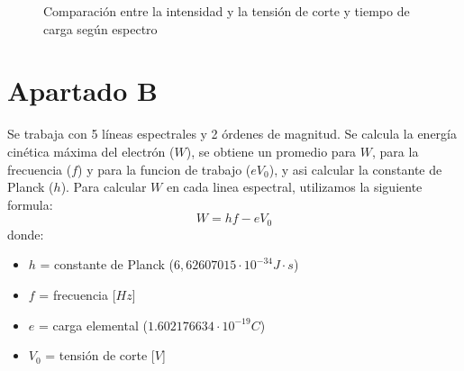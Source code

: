\documentclass[a4paper,12pt]{report}
\begin{document}
    \begin{figure}[h!]
      \begin{minipage}{0.4\textwidth} %
      \end{minipage}
      \hspace{1cm}
      \begin{minipage}{0.4\textwidth} %
      \end{minipage}
      \caption{Comparación entre la intensidad y la tensión de corte y tiempo de carga según espectro}
      \label{fig:comparison}
  \end{figure}

  \newpage

  \section{Apartado B}
    Se trabaja con 5 líneas espectrales y 2 órdenes de magnitud. Se calcula la energía cinética máxima del electrón
    ($W$), se obtiene un promedio para $W$, para la frecuencia ($f$) y para la funcion de trabajo ($eV_0$), y asi
    calcular la constante de Planck ($h$).
    Para calcular $W$ en cada linea espectral, utilizamos la siguiente formula:
    $$W = hf - eV_0$$
    donde:
    \begin{itemize}
      \item $h$ = constante de Planck ($6,62607015 \cdot 10^{-34} J \cdot s$)
      \item $f$ = frecuencia [$Hz$]
      \item $e$ = carga elemental ($1.602176634 \cdot 10^{-19} C$)
      \item $V_0$ = tensión de corte [$V$]
    \end{itemize}
\end{document}
